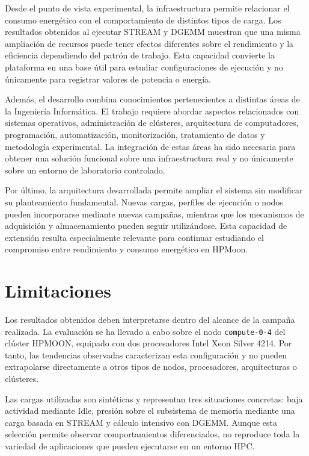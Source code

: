 Desde el punto de vista experimental, la infraestructura permite relacionar el consumo energético con el comportamiento de distintos tipos de carga. Los resultados obtenidos al ejecutar STREAM y DGEMM muestran que una misma ampliación de recursos puede tener efectos diferentes sobre el rendimiento y la eficiencia dependiendo del patrón de trabajo. Esta capacidad convierte la plataforma en una base útil para estudiar configuraciones de ejecución y no únicamente para registrar valores de potencia o energía.

Además, el desarrollo combina conocimientos pertenecientes a distintas áreas de la Ingeniería Informática. El trabajo requiere abordar aspectos relacionados con sistemas operativos, administración de clústeres, arquitectura de computadores, programación, automatización, monitorización, tratamiento de datos y metodología experimental. La integración de estas áreas ha sido necesaria para obtener una solución funcional sobre una infraestructura real y no únicamente sobre un entorno de laboratorio controlado.

Por último, la arquitectura desarrollada permite ampliar el sistema sin modificar su planteamiento fundamental. Nuevas cargas, perfiles de ejecución o nodos pueden incorporarse mediante nuevas campañas, mientras que los mecanismos de adquisición y almacenamiento pueden seguir utilizándose. Esta capacidad de extensión resulta especialmente relevante para continuar estudiando el compromiso entre rendimiento y consumo energético en HPMoon.

\section{Limitaciones}
\label{sec:limitaciones-conclusiones}

Los resultados obtenidos deben interpretarse dentro del alcance de la campaña realizada. La evaluación se ha llevado a cabo sobre el nodo \texttt{compute-0-4} del clúster HPMOON, equipado con dos procesadores Intel Xeon Silver 4214. Por tanto, las tendencias observadas caracterizan esta configuración y no pueden extrapolarse directamente a otros tipos de nodos, procesadores, arquitecturas o clústeres.

Las cargas utilizadas son sintéticas y representan tres situaciones concretas: baja actividad mediante Idle, presión sobre el subsistema de memoria mediante una carga basada en STREAM y cálculo intensivo con DGEMM. Aunque esta selección permite observar comportamientos diferenciados, no reproduce toda la variedad de aplicaciones que pueden ejecutarse en un entorno HPC.

